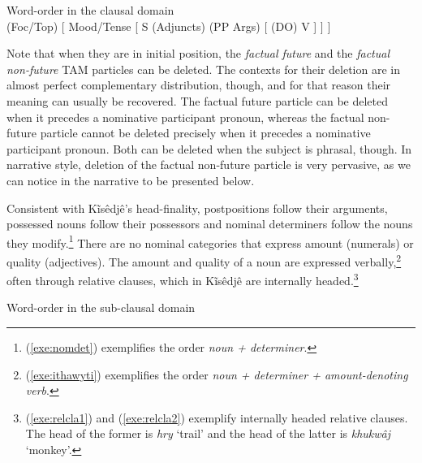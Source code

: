 \documentclass[output=paper,
modfonts,nonflat
]{langsci/langscibook}
\begin{document}
\ea  Word-order in the clausal domain  \\
\glt (Foc/Top) [ Mood/Tense [ S (Adjuncts) (PP Args) [ (DO) V ] ] ] 
\label{sch:wordorderclause}
\z

\noindent
Note that when they are in initial position, the \textit{factual future} and the
\textit{factual non-future} TAM particles can be deleted. The contexts
for their deletion are in almost perfect complementary distribution, though, and
for that reason their meaning can usually be recovered. The factual future particle
can be deleted when it precedes a nominative participant pronoun, whereas the
factual non-future particle cannot be deleted precisely when it precedes a
nominative participant pronoun. Both can be deleted when the subject is phrasal,
though. In narrative style, deletion of the factual non-future particle is very
pervasive, as we can notice in the narrative to be presented below.

Consistent with Kĩsêdjê's head-finality, postpositions follow their arguments,
possessed nouns follow their possessors and nominal determiners follow the nouns
they modify.\footnote{(\ref{exe:nomdet}) exemplifies the order \textit{noun +
determiner}.} There are no nominal categories that express amount (numerals) or
quality (adjectives). The amount and quality of a noun are expressed
verbally,\footnote{(\ref{exe:ithawyti}) exemplifies the order \textit{noun +
determiner + amount-denoting verb}.} often through relative clauses, which in
Kĩsêdjê are internally headed.\footnote{(\ref{exe:relcla1}) and
(\ref{exe:relcla2}) exemplify internally headed relative clauses. The head of
the former is \textit{hry} ‘trail’ and the head of the latter is
\textit{khukwâj} ‘monkey’.}

\ea  Word-order in the sub-clausal domain \\ 
\z 
\end{document}
